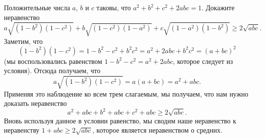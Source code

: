 \problem
Положительные числа $a$, $b$ и $c$ таковы, что $a^2+b^2+c^2+2abc=1$.
Докажите неравенство
\[
    a \sqrt{(1 - b^2) (1 - c^2)}
    +
    b \sqrt{(1 - c^2) (1 - a^2)}
    +
    c \sqrt{(1 - a^2) (1 - b^2)}
\geq
    2 \sqrt{abc}
.\]
\solution
Заметим, что
\[
    (1 - b^2) (1 - c^2)
=
    1 - b^2 - c^2 + b^2 c^2
=
    a^2 + 2 a b c + b^2 c^2
=
    (a + b c)^2
\]
(мы воспользовались равенством $1 - b^2 - c^2 = a^2 + 2 a b c$, которое следует
из условия).
Отсюда получаем, что
\[
    a \sqrt{(1 - b^2) (1 - c^2)} = a (a + b c) = a^2 + a b c
.\]
Применяя это наблюдение ко всем трем слагаемым, мы получаем, что нам нужно
доказать неравенство
\[
    a^2 + a b c + b^2 + a b c + c^2 + a b c \geq 2 \sqrt{a b c}
.\]
Вновь используя данное в условии равенство, мы сводим наше неравенство к
неравенству $1 + a b c \geq 2 \sqrt{a b c}$, которое является неравенством о
средних.
\endproblem
